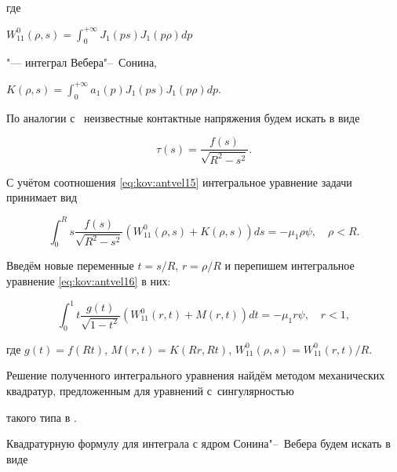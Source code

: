 где 

$\displaystyle W^{0}_{11}(\rho,s)=\int_{0}^{+\infty}J_{1}(p s)J_{1}(p \rho)dp$

"--- интеграл Вебера"--~Сонина,



\noindent

$\displaystyle K(\rho,s)=\int_{0}^{+\infty}a_{1}(p)J_{1}(p s)J_{1}(p \rho)dp$.



По аналогии с~\cite{antvel:bib:VelSteg-ru} неизвестные контактные напряжения будем искать в виде

\begin{equation}

\tau(s)=\frac{f(s)}{\sqrt{R^{2}-s^{2}}}.

\label{eq:kov:antvel15}

\end{equation}

С учётом соотношения \eqref{eq:kov:antvel15} интегральное уравнение задачи принимает вид

\begin{equation}

\int _{0}^{R}s \frac{f(s)}{\sqrt{R^{2}-s^{2}}}\left( W^{0}_{11}(\rho,s)+K(\rho,s)\right)ds=-\mu_{1} \rho \psi, \quad \rho<R.

\label{eq:kov:antvel16}

\end{equation}

Введём новые переменные $t={s}/{R}$, $r={\rho}/{R}$ и перепишем интегральное уравнение \eqref{eq:kov:antvel16} в них:

\begin{equation}

\int _{0}^{1}t \frac{g(t)}{\sqrt{1-t^{2}}}\left( W^{0}_{11}(r,t)+M(r,t)\right)dt=-\mu_{1} r \psi, \quad r<1, 

\label{eq:kov:antvel17}

\end{equation}

где $g(t)=f(Rt)$, $M(r,t)=K(Rr,Rt)$, $W^{0}_{11}(\rho,s)={W^{0}_{11}(r,t)}/{R}$.



Решение полученного интегрального уравнения найдём методом механических квадратур, предложенным для уравнений с~сингулярностью

такого типа в \cite{antvel:bib:VelSteg-ru}. 

Квадратурную формулу для интеграла с ядром Сонина"--~Вебера будем искать в виде

